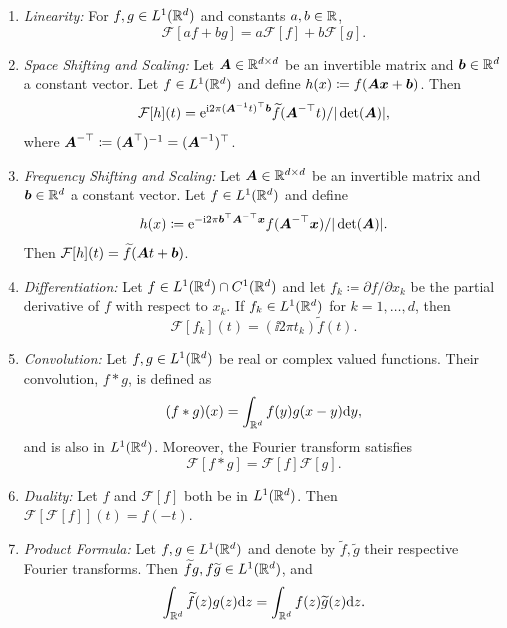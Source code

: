 \begin{enumerate}
	\item \textit{Linearity:} For \(f, g \in L^1(\mathbb{R}^d)\) and constants \(a, b \in \mathbb{R}\),
	      \begin{equation*}
		      \mathcal{F}[af + bg] = a\mathcal{F}[f] + b\mathcal{F}[g].
	      \end{equation*}
	\item \textit{Space Shifting and Scaling:} Let \(\boldsymbol{A} \in \mathbb{R}^{d \times d}\) be an invertible matrix and \(\boldsymbol{b} \in \mathbb{R}^d\) a constant vector. Let \(f \in L^1(\mathbb{R}^d)\) and define \(h(x) \coloneqq f(\boldsymbol{Ax} + \boldsymbol{b})\). Then
	      \begin{equation*}
		      \mathcal{F}[h](t) = \mathrm{e}^{\mathrm{i} 2\pi (\boldsymbol{A}^{-1} t)^\top \boldsymbol{b}} \widetilde{f}(\boldsymbol{A}^{-\top} t) / |\det(\boldsymbol{A})|,
	      \end{equation*}
	      where \(\boldsymbol{A}^{-\top} \coloneqq (\boldsymbol{A}^\top)^{-1} = (\boldsymbol{A}^{-1})^\top\).
	\item \textit{Frequency Shifting and Scaling:} Let \(\boldsymbol{A} \in \mathbb{R}^{d \times d}\) be an invertible matrix and \(\boldsymbol{b} \in \mathbb{R}^d\) a constant vector. Let \(f \in L^1(\mathbb{R}^d)\) and define
	      \begin{equation*}
		      h(x) \coloneqq \mathrm{e}^{-\mathrm{i} 2\pi \boldsymbol{b}^\top \boldsymbol{A}^{-\top} \boldsymbol{x}} f(\boldsymbol{A}^{-\top} \boldsymbol{x}) / |\det(\boldsymbol{A})|.
	      \end{equation*}
	      Then \(\mathcal{F}[h](t) = \widetilde{f}(\boldsymbol{A}t + \boldsymbol{b})\).
	\item \textit{Differentiation:} Let \(f \in L^1(\mathbb{R}^d) \cap C^1(\mathbb{R}^d)\) and let \(f_k \coloneqq \partial f / \partial x_k\) be the partial derivative of \(f\) with respect to \(x_k\). If \(f_k \in L^1(\mathbb{R}^d)\) for \(k=1, \dots, d\), then
	      \begin{equation*}
		      \mathcal{F}[f_k](t) = (\ii 2\pi t_k) \widetilde{f}(t).
	      \end{equation*}
	\item \textit{Convolution:} Let \(f, g \in L^1(\mathbb{R}^d)\) be real or complex valued functions. Their convolution, \(f * g\), is defined as
	      \begin{equation*}
		      (f * g)(x) = \int_{\mathbb{R}^d} f(y) g(x-y) \mathrm{d} y,
	      \end{equation*}
	      and is also in \(L^1(\mathbb{R}^d)\). Moreover, the Fourier transform satisfies
	      \begin{equation*}
		      \mathcal{F}[f * g] = \mathcal{F}[f]\mathcal{F}[g].
	      \end{equation*}
	\item \textit{Duality:} Let \(f\) and \(\mathcal{F}[f]\) both be in \(L^1(\mathbb{R}^d)\). Then \(\mathcal{F}[\mathcal{F}[f]](t) = f(-t)\).
	\item \textit{Product Formula:} Let \(f, g \in L^1(\mathbb{R}^d)\) and denote by \(\widetilde{f}, \widetilde{g}\) their respective Fourier transforms. Then \(\widetilde{f}g, f\widetilde{g} \in L^1(\mathbb{R}^d)\), and
	      \begin{equation*}
		      \int_{\mathbb{R}^d} \widetilde{f}(z) g(z) \mathrm{d} z = \int_{\mathbb{R}^d} f(z) \widetilde{g}(z) \mathrm{d} z.
	      \end{equation*}
\end{enumerate}

